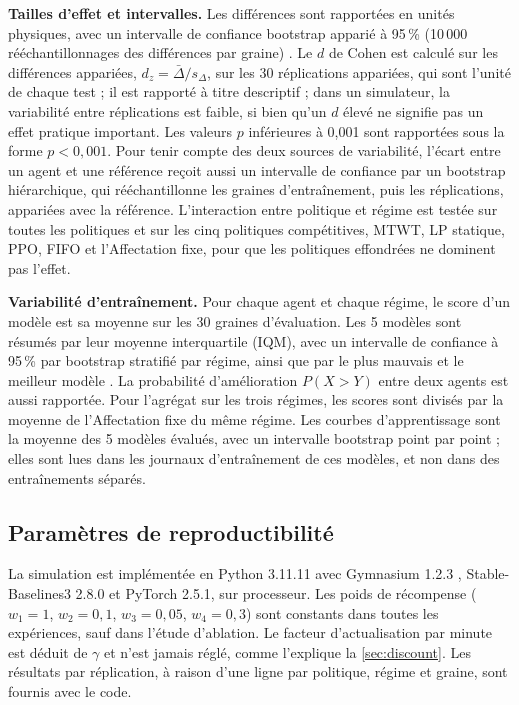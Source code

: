 \documentclass[11pt,a4paper]{article}
\newif\ifrevmarks
\newcommand{\revtag}[1]{\ifrevmarks\textsuperscript{\textcolor{red!70!black}{\scriptsize[#1]}}\fi}
\newcommand{\rev}[2]{\ifrevmarks{\color{revcolor}#2}\revtag{#1}\else#2\fi}
\newenvironment{revbloc}[1]{\par\ifrevmarks\color{revcolor}\noindent\revtag{#1}\ \fi}{\par}
\newif\ifcorrmarks
\newcommand{\corr}[1]{\ifcorrmarks\textcolor{corrcolor}{#1}\else#1\fi}
\begin{document}
\begin{revbloc}{M3, M4, M5, M6, M7, M22, v3}
\textbf{Tailles d'effet et intervalles.} Les différences sont rapportées en unités physiques, avec un intervalle de confiance bootstrap apparié à 95\,\% (10\,000 rééchantillonnages des différences par graine) \cite{EfronTibshirani1993}. \corr{Le $d$ de Cohen est calculé sur les différences appariées, $d_z = \bar{\Delta}/s_{\Delta}$, sur les 30 réplications appariées, qui sont l'unité de chaque test ;} il est rapporté à titre descriptif ; dans un simulateur, la variabilité entre réplications est faible, si bien qu'un $d$ élevé ne signifie pas un effet pratique important. Les valeurs $p$ inférieures à 0,001 sont rapportées sous la forme $p<0{,}001$. \corr{Pour tenir compte des deux sources de variabilité, l'écart entre un agent et une référence reçoit aussi un intervalle de confiance par un bootstrap hiérarchique, qui rééchantillonne les graines d'entraînement, puis les réplications, appariées avec la référence. L'interaction entre politique et régime est testée sur toutes les politiques et sur les cinq politiques compétitives, MTWT, \corr{LP statique}, PPO, FIFO et l'Affectation fixe, pour que les politiques effondrées ne dominent pas l'effet.}

\textbf{Variabilité d'entraînement.} Pour chaque agent et chaque régime, le score d'un modèle est sa moyenne sur les 30 graines d'évaluation. Les 5 modèles sont résumés par leur moyenne interquartile (IQM), avec un intervalle de confiance à 95\,\% par bootstrap stratifié par régime, ainsi que par le plus mauvais et le meilleur modèle \cite{Agarwal2021}. La probabilité d'amélioration $P(X > Y)$ entre deux agents est aussi rapportée. Pour l'agrégat sur les trois régimes, les scores sont divisés par la moyenne de l'Affectation fixe du même régime. Les courbes d'apprentissage sont la moyenne des 5 modèles évalués, avec un intervalle bootstrap point par point ; elles sont lues dans les journaux d'entraînement de ces modèles, et non dans des entraînements séparés.
\end{revbloc}

\subsection{Paramètres de reproductibilité}

\begin{revbloc}{M3, A}
La simulation est implémentée en Python 3.11.11 avec Gymnasium 1.2.3 \cite{MarkTowers2025}, Stable-Baselines3 2.8.0 \cite{AntoninRaffin2021} et PyTorch 2.5.1, sur processeur. Les poids de récompense ($w_1 = 1$, $w_2 = 0{,}1$, $w_3 = 0{,}05$, $w_4 = 0{,}3$) sont constants dans toutes les expériences, sauf dans l'étude d'ablation. \rev{v3}{Le facteur d'actualisation par minute est déduit de $\gamma$ et n'est jamais réglé, comme l'explique la \cref{sec:discount}.} Les résultats par réplication, à raison d'une ligne par politique, régime et graine, sont fournis avec le code.
\end{revbloc}
\end{document}

